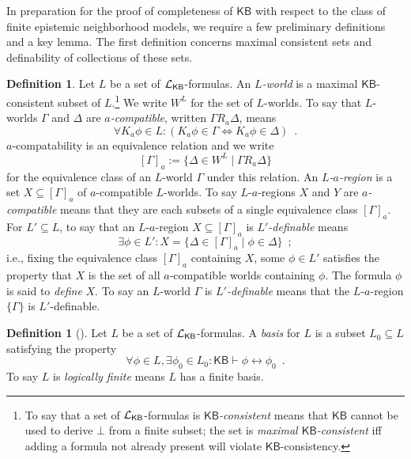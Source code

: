 \documentclass[12pt]{article}
\theoremstyle{definition}
\newtheorem{definition}[theorem]{Definition}
\newcommand{\Lang}{{\cal L}}   %
\newcommand{\KB}{{\mathsf{KB}}}                        %
\begin{document}
In preparation for the proof of completeness of $\KB$ with respect to
the class of finite epistemic neighborhood models, we require
a few preliminary definitions and a key lemma.  The first definition concerns maximal
consistent sets and definability of collections of these sets.

\begin{definition}
  \label{definition:definability}
  Let $L$ be a set of $\Lang_\KB$-formulas.
  An \emph{$L$-world} is a maximal $\KB$-consistent subset of $L$.\footnote{To say 
  that a set of $\Lang_\KB$-formulas is \emph{$\KB$-consistent}
  means that $\KB$ cannot be used to derive $\bot$ from a finite subset; the set is 
  \emph{maximal $\KB$-consistent}
  iff adding a formula not already present will violate $\KB$-consistency.}
  We write $W^L$ for the set of $L$-worlds.
  To say that $L$-worlds $\Gamma$ and $\Delta$ are \emph{$a$-compatible}, written
  $\Gamma R_a\Delta$, means
  \[
  \forall K_a\phi\in L:(K_a\phi\in\Gamma \Leftrightarrow K_a\phi\in\Delta)\enspace.
  \]
  $a$-compatability is an equivalence relation and we write
  \[
  [\Gamma]_a := \{\Delta\in W^L\mid \Gamma R_a\Delta\}
  \]
  for the equivalence class of an $L$-world $\Gamma$ under this relation.
  An \emph{$L$-$a$-region} is a set $X\subseteq[\Gamma]_a$
  of $a$-compatible $L$-worlds.
  To say $L$-$a$-regions $X$ and $Y$ are \emph{$a$-compatible} means
  that they are each subsets of a single equivalence class $[\Gamma]_a$.
  For $L'\subseteq L$, to say that an $L$-$a$-region $X\subseteq[\Gamma]_a$ is \emph{$L'$-definable}
  means
  \[
  \textstyle
  \exists\phi\in L':
  X=\{\Delta\in[\Gamma]_a\mid \phi\in\Delta\}\enspace;
  \]
  i.e., fixing the equivalence class $[\Gamma]_a$ containing $X$, some
  $\phi\in L'$ satisfies the property that $X$ is the set of all
  $a$-compatible worlds containing $\phi$.  The formula $\phi$ is said
  to \emph{define} $X$.  To say an $L$-world $\Gamma$ is
  \emph{$L'$-definable} means that the $L$-$a$-region $\{\Gamma\}$ is
  $L'$-definable.
\end{definition}

\begin{definition}[\cite{Segerberg1971:qpiams}]
  Let $L$ be a  set of $\Lang_\KB$-formulas.
  A \emph{basis} for $L$ is a subset $L_0\subseteq L$ satisfying the property
  \[
  \forall \phi\in L,\exists \phi_0\in L_0:
  \KB\vdash\phi\leftrightarrow\phi_0\enspace.
  \]
  To say $L$ is \emph{logically finite} means $L$ has a finite basis.
\end{definition}
\end{document}
